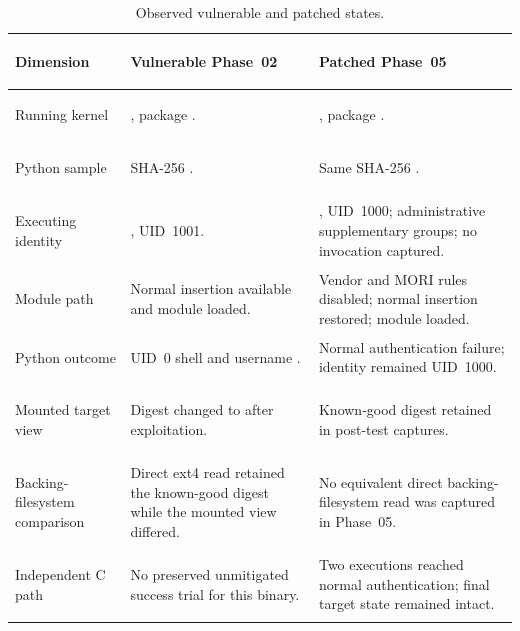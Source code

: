 \begin{table}[H]
    \centering
    \caption{Observed vulnerable and patched states.}
    \label{tab:vulnerable-patched-differential}
    \scriptsize
    \begin{tabularx}{\textwidth}{@{}>{\bfseries\raggedright\arraybackslash}p{}>{\raggedright\arraybackslash}p{}Y@{}}
        \toprule
        Dimension & Vulnerable Phase~02 & Patched Phase~05 \\
        \midrule
        Running kernel &
        , package . &
        , package . \\

        Python sample &
        SHA-256 . &
        Same SHA-256 . \\

        Executing identity &
        , UID~1001. &
        , UID~1000; administrative supplementary groups; no
         invocation captured. \\

        Module path &
        Normal  insertion available and module loaded. &
        Vendor and MORI rules disabled; normal insertion restored; module
        loaded. \\

        Python outcome &
        UID~0 shell and username . &
        Normal  authentication failure; identity remained UID~1000. \\

        Mounted target view &
        Digest changed to  after exploitation. &
        Known-good digest  retained in post-test
        captures. \\

        Backing-filesystem comparison &
        Direct ext4 read retained the known-good digest while the mounted view
        differed. &
        No equivalent direct backing-filesystem read was captured in Phase~05. \\

        Independent C path &
        No preserved unmitigated success trial for this binary. &
        Two executions reached normal authentication; final target state
        remained intact. \\
        \bottomrule
    \end{tabularx}
\end{table}

